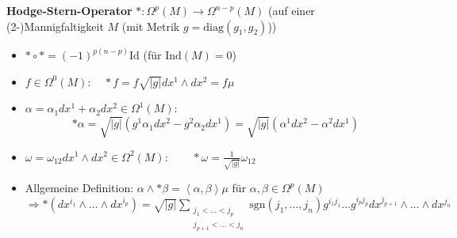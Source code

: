 \documentclass[handout]{beamer}
\begin{document}
  \begin{frame}
    \begin{block}{\textbf{Hodge-Stern-Operator} \( *: \Omega^{p}(M) \longrightarrow \Omega^{n-p}(M)\) (auf einer (2-)Mannigfaltigkeit \( M \) (mit Metrik \( g = \text{diag}(g_{1}, g_{2}) \)))}
      \begin{itemize}
        \item<2-> \( * \circ * = (-1)^{p(n-p)}\text{Id} \) \qquad (für \( \text{Ind}(M) = 0 \))
        \item<3-> \( f \in \Omega^{0}(M):\quad * f = f \sqrt{|g|} dx^{1}\wedge dx^{2}  = f\mu\) 
        \item<4-> \( \alpha = \alpha_{1}dx^{1} + \alpha_{2}dx^{2} \in \Omega^{1}(M):\) 
              \[ *\alpha = \sqrt{|g|} \left( g^{1} \alpha_{1}dx^{2} - g^{2} \alpha_{2}dx^{1} \right) = \sqrt{|g|} \left( \alpha^{1}dx^{2} - \alpha^{2}dx^{1} \right)\]
        \item<5-> \( \omega = \omega_{12}dx^{1}\wedge dx^{2} \in \Omega^{2}(M):\qquad *\omega = \frac{1}{\sqrt{|g|}}\omega_{12} \)
        \item<6-> Allgemeine Definition: \( \alpha \wedge *\beta = \left\langle \alpha , \beta \right\rangle \mu\) für \( \alpha, \beta \in \Omega^{p}(M) \)\\
              \( \Rightarrow *\left( dx^{i_{1}} \wedge \ldots \wedge dx^{i_{p}} \right) 
                  = \sqrt{|g|} \sum_{\begin{smallmatrix}
                                          j_{1}<\ldots<j_{p} \\
                                          j_{p+1}<\ldots<j_{n}
                                     \end{smallmatrix}} \text{sgn}\left( j_{1}, \ldots, j_{n} \right) g^{i_{1}j_{1}}\ldots g^{i_{p}j_{p}} dx^{j_{p+1}} \wedge \ldots \wedge dx^{j_{n}}\)
      \end{itemize}
    \end{block}
  \end{frame}
\end{document}
